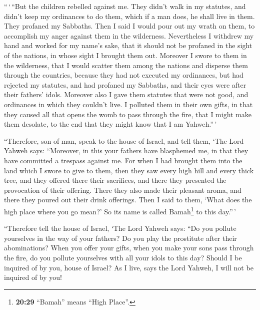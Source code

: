  ``\,`\,``But the children rebelled against me. They
didn't walk in my statutes, and didn't keep my ordinances to do them,
which if a man does, he shall live in them. They profaned my Sabbaths.
Then I said I would pour out my wrath on them, to accomplish my anger
against them in the wilderness.  Nevertheless I withdrew
my hand and worked for my name's sake, that it should not be profaned in
the sight of the nations, in whose sight I brought them out.
 Moreover I swore to them in the wilderness, that I would
scatter them among the nations and disperse them through the countries,
 because they had not executed my ordinances, but had
rejected my statutes, and had profaned my Sabbaths, and their eyes were
after their fathers' idols.  Moreover also I gave them
statutes that were not good, and ordinances in which they couldn't live.
 I polluted them in their own gifts, in that they caused
all that opens the womb to pass through the fire, that I might make them
desolate, to the end that they might know that I am Yahweh.''\,'

 ``Therefore, son of man, speak to the house of Israel,
and tell them, `The Lord Yahweh says: ``Moreover, in this your fathers
have blasphemed me, in that they have committed a trespass against me.
 For when I had brought them into the land which I swore
to give to them, then they saw every high hill and every thick tree, and
they offered there their sacrifices, and there they presented the
provocation of their offering. There they also made their pleasant
aroma, and there they poured out their drink offerings. 
Then I said to them, `What does the high place where you go mean?' So
its name is called Bamah\footnote{\textbf{20:29} ``Bamah'' means ``High
  Place''.} to this day.''\,'

 ``Therefore tell the house of Israel, `The Lord Yahweh
says: ``Do you pollute yourselves in the way of your fathers? Do you
play the prostitute after their abominations?  When you
offer your gifts, when you make your sons pass through the fire, do you
pollute yourselves with all your idols to this day? Should I be inquired
of by you, house of Israel? As I live, says the Lord Yahweh, I will not
be inquired of by you!


